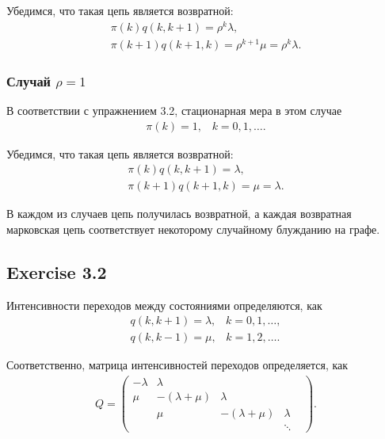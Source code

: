 \documentclass[10pt]{article}
\begin{document}
Убедимся, что такая цепь является возвратной:
\begin{gather*}
  \pi(k) q(k, k + 1) = \rho^k \lambda, \\
  \pi(k + 1) q(k + 1, k) = \rho^{k + 1} \mu = \rho^k \lambda.
\end{gather*}

\subsubsection{Случай $\rho = 1$}

В соответствии с упражнением 3.2, стационарная мера в этом случае
\begin{gather*}
  \pi(k) = 1, \;\;\; k = 0, 1, \ldots .
\end{gather*}

Убедимся, что такая цепь является возвратной:
\begin{gather*}
  \pi(k) q(k, k + 1) = \lambda, \\
  \pi(k + 1) q(k + 1, k) = \mu = \lambda.
\end{gather*}

В каждом из случаев цепь получилась возвратной, а каждая возвратная марковская цепь соответствует некоторому случайному блужданию на графе.

\subsection{Exercise 3.2}

Интенсивности переходов между состояниями определяются, как
\begin{gather*}
  q(k, k + 1) = \lambda, \;\;\; k = 0, 1, \ldots , \\
  q(k, k - 1) = \mu, \;\;\; k = 1, 2, \ldots .
\end{gather*}

Соответственно, матрица интенсивностей переходов определяется, как
\begin{gather*}
  Q = \left( \begin{matrix}
    -\lambda & \lambda          &                  &         & \\
    \mu      & -(\lambda + \mu) & \lambda          &         & \\
             & \mu              & -(\lambda + \mu) & \lambda & \\
             &                  &                  & \ddots  &  
 \end{matrix} \right).
\end{gather*}
\end{document}

